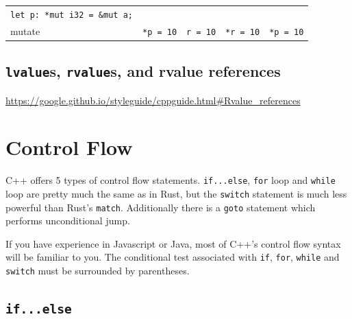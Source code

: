 \documentclass[
]{book}
\begin{document}
\begin{longtable}[]{@{}lllll@{}}
\begin{minipage}[t]{0.25\columnwidth}
\texttt{let\ p:\ *mut\ i32\ =\ \&mut\ a;}\strut
\end{minipage}\tabularnewline
\begin{minipage}[t]{0.12\columnwidth}\raggedright
mutate\strut
\end{minipage} & \begin{minipage}[t]{0.12\columnwidth}\raggedright
\texttt{*p\ =\ 10}\strut
\end{minipage} & \begin{minipage}[t]{0.14\columnwidth}\raggedright
\texttt{r\ =\ 10}\strut
\end{minipage} & \begin{minipage}[t]{0.24\columnwidth}\raggedright
\texttt{*r\ =\ 10}\strut
\end{minipage} & \begin{minipage}[t]{0.25\columnwidth}\raggedright
\texttt{*p\ =\ 10}\strut
\end{minipage}\tabularnewline
\bottomrule
\end{longtable}

\hypertarget{lvalues-rvalues-and-rvalue-references}{%
\subsection{\texorpdfstring{\texttt{lvalue}s, \texttt{rvalue}s, and rvalue references}{lvalues, rvalues, and rvalue references}}\label{lvalues-rvalues-and-rvalue-references}}

\url{https://google.github.io/styleguide/cppguide.html\#Rvalue_references}

\hypertarget{control-flow}{%
\section{Control Flow}\label{control-flow}}

C++ offers 5 types of control flow statements. \texttt{if...else}, \texttt{for} loop and \texttt{while} loop are pretty much the same as in Rust, but the \texttt{switch} statement is much less powerful than Rust's \texttt{match}. Additionally there is a \texttt{goto} statement which performs unconditional jump.

If you have experience in Javascript or Java, most of C++'s control flow syntax will be familiar to you. The conditional test associated with \texttt{if}, \texttt{for}, \texttt{while} and \texttt{switch} must be surrounded by parentheses.

\hypertarget{if...else}{%
\subsection{\texorpdfstring{\texttt{if...else}}{if...else}}\label{if...else}}
\end{document}
